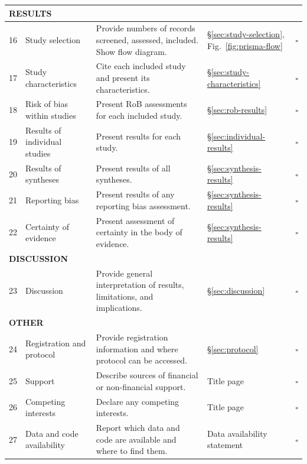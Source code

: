 \begin{longtable}{p{0.5cm} p{3cm} p{6cm} p{2cm} p{1.5cm}}
\multicolumn{5}{l}{\textbf{RESULTS}} \\
\midrule
16 & Study selection & Provide numbers of records screened, assessed, included. Show flow diagram. & \S\ref{sec:study-selection}, Fig.~\ref{fig:prisma-flow} & $\square$ \\
17 & Study characteristics & Cite each included study and present its characteristics. & \S\ref{sec:study-characteristics} & $\square$ \\
18 & Risk of bias within studies & Present RoB assessments for each included study. & \S\ref{sec:rob-results} & $\square$ \\
19 & Results of individual studies & Present results for each study. & \S\ref{sec:individual-results} & $\square$ \\
20 & Results of syntheses & Present results of all syntheses. & \S\ref{sec:synthesis-results} & $\square$ \\
21 & Reporting bias & Present results of any reporting bias assessment. & \S\ref{sec:synthesis-results} & $\square$ \\
22 & Certainty of evidence & Present assessment of certainty in the body of evidence. & \S\ref{sec:synthesis-results} & $\square$ \\
\midrule

\multicolumn{5}{l}{\textbf{DISCUSSION}} \\
\midrule
23 & Discussion & Provide general interpretation of results, limitations, and implications. & \S\ref{sec:discussion} & $\square$ \\
\midrule

\multicolumn{5}{l}{\textbf{OTHER}} \\
\midrule
24 & Registration and protocol & Provide registration information and where protocol can be accessed. & \S\ref{sec:protocol} & $\square$ \\
25 & Support & Describe sources of financial or non-financial support. & Title page & $\square$ \\
26 & Competing interests & Declare any competing interests. & Title page & $\square$ \\
27 & Data and code availability & Report which data and code are available and where to find them. & Data availability statement & $\square$ \\
\bottomrule
\end{longtable}
